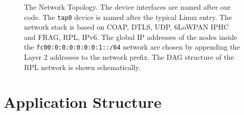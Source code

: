 \documentclass[acmtog, language=english, nonacm]{acmart}
\begin{document}
\begin{figure}[!hbtp]
        \caption{The Network Topology. The device interfaces are named after our code. The \texttt{tap0} device is named after the typical Linux entry. The network stack is based on COAP, DTLS, UDP, 6LoWPAN IPHC and FRAG, RPL, IPv6. The global IP addresses of the nodes inside the \texttt{fc00:0:0:0:0:0:0:1::/64} network are chosen by appending the Layer 2 addresses to the network prefix. The DAG structure of the RPL network is shown schematically.}
    \end{figure}

    \section{Application Structure}
\end{document}
